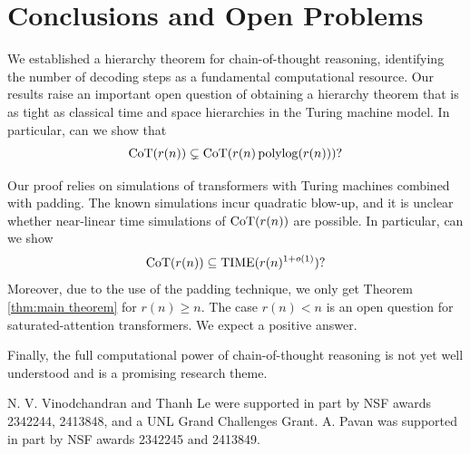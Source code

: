 \section{Conclusions and Open Problems} %


We established a hierarchy theorem for chain-of-thought reasoning, identifying the number of decoding steps as a fundamental computational resource. Our results raise an important open question of obtaining a hierarchy theorem that is as tight as classical time and space hierarchies in the Turing machine model. In particular, can we show that
\[
\mbox{\rm CoT}(r(n)) \subsetneq \mbox{\rm CoT}(r(n)\,\mathrm{polylog}(r(n)))?
\]

Our proof relies on simulations of transformers with Turing machines combined with padding. 
The known simulations incur quadratic blow-up, and it is unclear whether near-linear time simulations of $\mbox{\rm CoT}(r(n))$ are possible. In particular, can we show
\[
\mbox{\rm CoT}(r(n)) \subseteq \mathrm{TIME}(r(n)^{1+o(1)})?
\]
Moreover, due to the use of the padding technique, we only get Theorem \ref{thm:main theorem} for $r(n) \geq n$. The case $r(n) < n$ is an open question for saturated-attention transformers. We expect a positive answer.

Finally, the full computational power of chain-of-thought reasoning is not yet well understood and is a promising research theme. 

\begin{ack}

N. V. Vinodchandran and Thanh Le were supported in part by NSF awards 2342244, 2413848, and a UNL Grand Challenges Grant.
A. Pavan was supported in part by NSF awards 2342245 and 2413849.
\end{ack}

